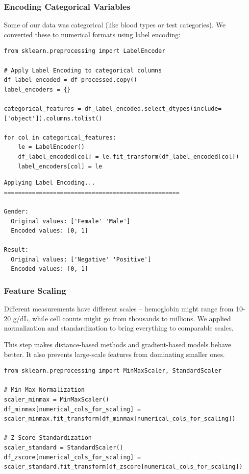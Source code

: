 \documentclass[12pt,a4paper]{article}
\begin{document}
\subsubsection{Encoding Categorical Variables}

Some of our data was categorical (like blood types or test categories). We converted these to numerical formats using label encoding:

\begin{lstlisting}
from sklearn.preprocessing import LabelEncoder

# Apply Label Encoding to categorical columns
df_label_encoded = df_processed.copy()
label_encoders = {}

categorical_features = df_label_encoded.select_dtypes(include=['object']).columns.tolist()

for col in categorical_features:
    le = LabelEncoder()
    df_label_encoded[col] = le.fit_transform(df_label_encoded[col])
    label_encoders[col] = le
\end{lstlisting}

\begin{verbatim}
Applying Label Encoding...
==================================================

Gender:
  Original values: ['Female' 'Male']
  Encoded values: [0, 1]

Result:
  Original values: ['Negative' 'Positive']
  Encoded values: [0, 1]
\end{verbatim}

\subsubsection{Feature Scaling}

Different measurements have different scales – hemoglobin might range from 10-20 g/dL, while cell counts might go from thousands to millions. We applied normalization and standardization to bring everything to comparable scales.

This step makes distance-based methods and gradient-based models behave better. It also prevents large-scale features from dominating smaller ones.

\begin{lstlisting}
from sklearn.preprocessing import MinMaxScaler, StandardScaler

# Min-Max Normalization
scaler_minmax = MinMaxScaler()
df_minmax[numerical_cols_for_scaling] = scaler_minmax.fit_transform(df_minmax[numerical_cols_for_scaling])

# Z-Score Standardization
scaler_standard = StandardScaler()
df_zscore[numerical_cols_for_scaling] = scaler_standard.fit_transform(df_zscore[numerical_cols_for_scaling])
\end{lstlisting}
\end{document}
